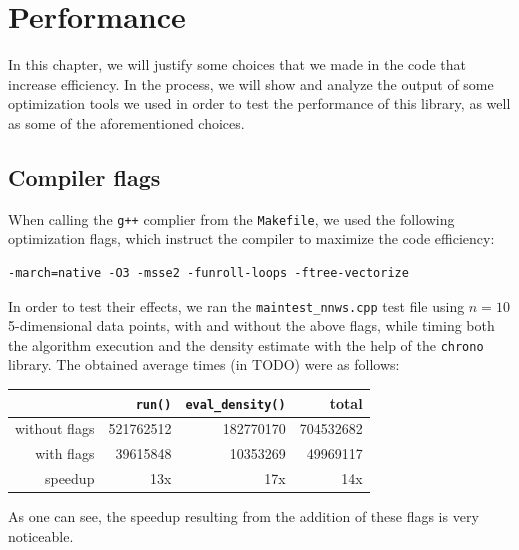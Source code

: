 \chapter{Performance}
In this chapter, we will justify some choices that we made in the code that increase efficiency.
In the process, we will show and analyze the output of some optimization tools we used in order to test the performance of this library, as well as some of the aforementioned choices.

\section{Compiler flags}
When calling the \verb|g++| complier from the \verb|Makefile|, we used the following optimization flags, which instruct the compiler to maximize the code efficiency:
\begin{verbatim}
-march=native -O3 -msse2 -funroll-loops -ftree-vectorize
\end{verbatim}
In order to test their effects, we ran the \verb|maintest_nnws.cpp| test file using $n=10$ 5-dimensional data points, with and without the above flags, while timing both the algorithm execution and the density estimate with the help of the \verb|chrono| library.
The obtained average times (in TODO) were as follows:
\begin{center}
	\begin{tabular}{r|r|r|r}
	              	& \verb|run()| & \verb|eval_density()| & total \\ \hline
		without flags & 521762512 & 182770170 & 704532682 \\
		with flags    &  39615848 &  10353269 &  49969117 \\
		speedup       &       13x &       17x &       14x
	\end{tabular}
\end{center}
As one can see, the speedup resulting from the addition of these flags is very noticeable.



